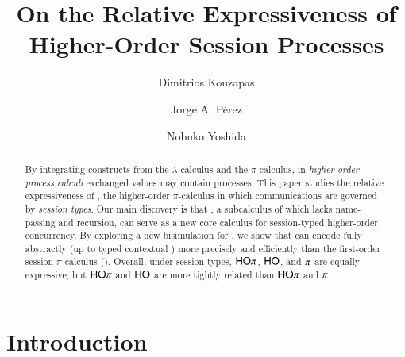 \documentclass[runningheads]{llncs}
\begin{document}
\title{On the Relative Expressiveness of\\ 
Higher-Order Session Processes
}

\author{
	Dimitrios Kouzapas
	\and
	Jorge A. P\'{e}rez
	\and Nobuko Yoshida
}
\maketitle





%

\begin{abstract}
By integrating
constructs from the $\lambda$-calculus and 
the $\pi$-calculus,
in \emph{higher-order process calculi} exchanged values may contain processes.
This paper studies the relative expressiveness of \HOp, 
the higher-order $\pi$-calculus in
which communications are governed by \emph{session types}. 
Our main discovery is that \HO, a subcalculus of \HOp which lacks name-passing and recursion, 
can serve as a new core calculus for session-typed higher-order
concurrency. By exploring a new bisimulation for \HO, we show that
 \HO can encode \HOp fully abstractly 
(up to typed contextual )
more precisely and efficiently than the first-order 
session $\pi$-calculus (\sessp).
Overall, under session types, 
$\mathsf{HO}\pi$, $\mathsf{HO}$, and $\pi$ 
are equally expressive; but 
$\mathsf{HO}\pi$ and $\mathsf{HO}$ are more tightly related than 
$\mathsf{HO}\pi$ and $\pi$.
\end{abstract}


\section{Introduction}
\label{sec:intro}
%
\end{document}
